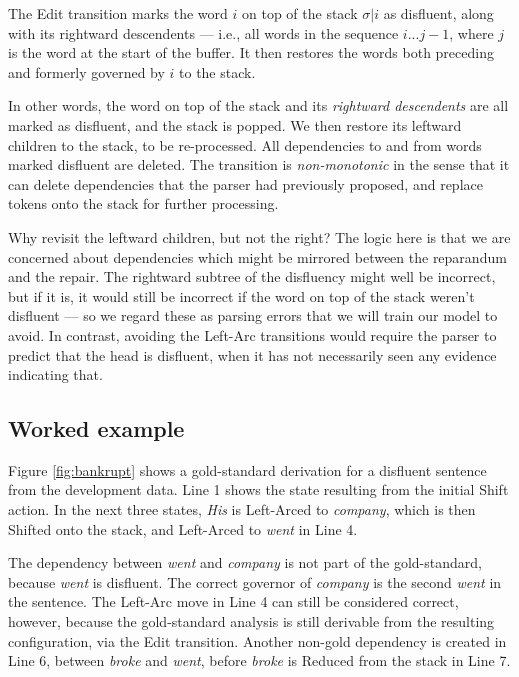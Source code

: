\documentclass[11pt,letterpaper]{article}
\begin{document}
The Edit transition marks the word $i$ on top of the stack $\sigma | i$ as
disfluent, along with its rightward descendents --- i.e., all words in the
sequence $i...j-1$, where $j$ is the word at the start of the buffer. It then
restores the words both preceding and formerly governed by $i$ to the stack.

In other words, the word on top of the stack and its \emph{rightward descendents}
are all marked as disfluent, and the stack is popped. We then restore its
leftward children to the stack, to be re-processed.
All dependencies to and from words marked disfluent are deleted. 
The transition is \emph{non-monotonic} in the sense that it can delete dependencies
that the parser had previously proposed, and replace tokens onto the stack for
further processing. 

Why revisit the leftward children, but not the right? The logic here is that we
are concerned about dependencies which might be mirrored between the reparandum
and the repair. The rightward subtree of the disfluency might well be incorrect,
but if it is, it would still be incorrect if the word on top of the stack weren't
disfluent --– so we regard these as parsing errors that we will train our model
to avoid. In contrast, avoiding the Left-Arc transitions would require the parser to
predict that the head is disfluent, when it has not necessarily seen any evidence
indicating that.

\subsection{Worked example}

Figure \ref{fig:bankrupt} shows a gold-standard derivation for a disfluent sentence
from the development data.
Line 1 shows the state resulting from the initial Shift action.  In the next three
states, \emph{His} is Left-Arced to \emph{company}, which is then Shifted onto
the stack, and Left-Arced to \emph{went} in Line 4.

The dependency between \emph{went} and \emph{company} is not part of the gold-standard,
because \emph{went} is disfluent.  The correct governor of \emph{company} is the
second \emph{went} in the sentence.  The Left-Arc move in Line 4 can still
be considered correct, however, because the gold-standard analysis is still
derivable from the resulting configuration, via the Edit transition.
Another non-gold dependency is created in Line 6, between \emph{broke} and \emph{went},
before \emph{broke} is Reduced from the stack in Line 7.
\end{document}

